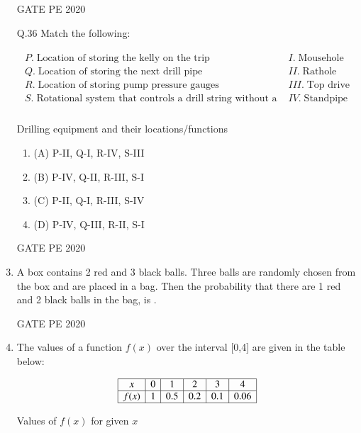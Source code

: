 \documentclass[journal,12pt,onecolumn]{IEEEtran}
\theoremstyle{remark}
\begin{document}
\begin{enumerate}
  \hfill{GATE PE 2020}
   
\item[Q.36] Match the following:

\begin{table}[h!]
\centering
\begin{align}
\begin{array}{ll}
P.\; \text{Location of storing the kelly on the trip} & I.\; \text{Mousehole} \\
Q.\; \text{Location of storing the next drill pipe} & II.\; \text{Rathole} \\
R.\; \text{Location of storing pump pressure gauges} & III.\; \text{Top drive} \\
S.\; \text{Rotational system that controls a drill string without a kelly} & IV.\; \text{Standpipe} \\
\end{array}
\end{align}
\caption{Drilling equipment and their locations/functions}
\end{table}


  
\begin{multicols}{2}
\begin{enumerate}
\item (A) P-II, Q-I, R-IV, S-III
\item (B) P-IV, Q-II, R-III, S-I
\item (C) P-II, Q-I, R-III, S-IV
\item (D) P-IV, Q-III, R-II, S-I
\end{enumerate}
\end{multicols}

  \hfill{GATE PE 2020}
   
\item A box contains 2 red and 3 black balls. Three balls are randomly chosen from the box and are placed in a bag. Then the probability that there are 1 red and 2 black balls in the bag, is .

   

  \hfill{GATE PE 2020}
   
\item The values of a function $f(x)$ over the interval [0,4] are given in the table below:

\begin{table}[h!]
\centering
\begin{align}
\begin{array}{|c|c|c|c|c|c|}
\hline
x & 0 & 1 & 2 & 3 & 4 \\
\hline
f(x) & 1 & 0.5 & 0.2 & 0.1 & 0.06 \\
\hline
\end{array}
\end{align}
\caption{Values of $f(x)$ for given $x$}
\end{table}


\end{enumerate}
\end{document}
